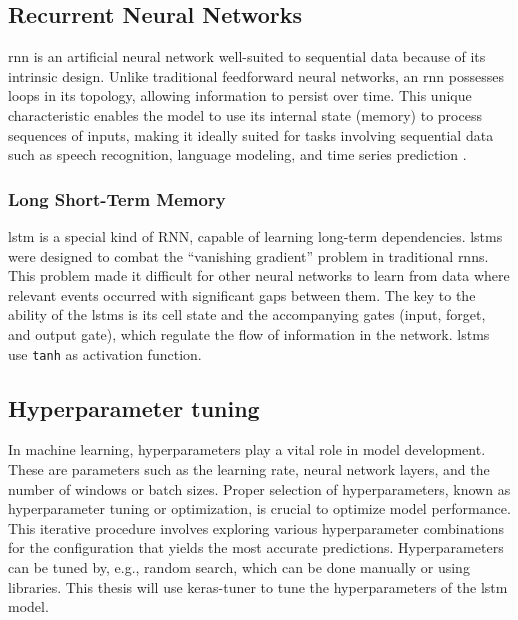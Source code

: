 \subsection{Recurrent Neural Networks}

\ac{rnn} is an artificial neural network well-suited to sequential data because of its intrinsic design.
Unlike traditional feedforward neural networks, an \ac{rnn} possesses loops in its topology, allowing information to persist over time.
This unique characteristic enables the model to use its internal state (memory) to process sequences of inputs, making it ideally suited for tasks involving sequential data such as speech recognition, language modeling, and time series prediction \cite{elman_finding_1990}.

\subsubsection{Long Short-Term Memory}

\ac{lstm} is a special kind of RNN, capable of learning long-term dependencies.
\acp{lstm} were designed to combat the ``vanishing gradient'' problem in traditional \acp{rnn}. 
This problem made it difficult for other neural networks to learn from data where relevant events occurred with significant gaps between them.
The key to the ability of the \acp{lstm} is its cell state and the accompanying gates (input, forget, and output gate), which regulate the flow of information in the network.
\acp{lstm} use \texttt{tanh} as activation function.

\subsection{Hyperparameter tuning}

In machine learning, hyperparameters play a vital role in model development.
These are parameters such as the learning rate, neural network layers, and the number of windows or batch sizes.
Proper selection of hyperparameters, known as hyperparameter tuning or optimization, is crucial to optimize model performance.
This iterative procedure involves exploring various hyperparameter combinations for the configuration that yields the most accurate predictions.
Hyperparameters can be tuned by, e.g., random search, which can be done manually or using libraries.
This thesis will use keras-tuner \cite{keras_tuner} to tune the hyperparameters of the \ac{lstm} model.
